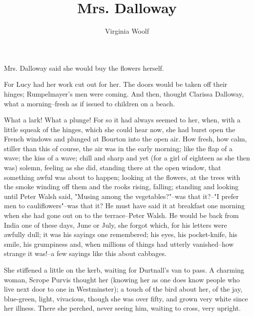 \documentclass[lang=cn,10pt]{elegantbook}
\title{Mrs. Dalloway}
\subtitle{Virginia Woolf}
\begin{document}
\maketitle
\frontmatter

\tableofcontents

\mainmatter

Mrs. Dalloway said she would buy the flowers herself.

For Lucy had her work cut out for her.  The doors would be taken
off their hinges; Rumpelmayer's men were coming.  And then, thought
Clarissa Dalloway, what a morning--fresh as if issued to children
on a beach.

What a lark!  What a plunge!  For so it had always seemed to her,
when, with a little squeak of the hinges, which she could hear now,
she had burst open the French windows and plunged at Bourton into
the open air.  How fresh, how calm, stiller than this of course,
the air was in the early morning; like the flap of a wave; the kiss
of a wave; chill and sharp and yet (for a girl of eighteen as she
then was) solemn, feeling as she did, standing there at the open
window, that something awful was about to happen; looking at the
flowers, at the trees with the smoke winding off them and the rooks
rising, falling; standing and looking until Peter Walsh said,
"Musing among the vegetables?"--was that it?--"I prefer men to
cauliflowers"--was that it?  He must have said it at breakfast one
morning when she had gone out on to the terrace--Peter Walsh.  He
would be back from India one of these days, June or July, she
forgot which, for his letters were awfully dull; it was his sayings
one remembered; his eyes, his pocket-knife, his smile, his
grumpiness and, when millions of things had utterly vanished--how
strange it was!--a few sayings like this about cabbages.

She stiffened a little on the kerb, waiting for Durtnall's van to
pass.  A charming woman, Scrope Purvis thought her (knowing her as
one does know people who live next door to one in Westminster); a
touch of the bird about her, of the jay, blue-green, light,
vivacious, though she was over fifty, and grown very white since
her illness.  There she perched, never seeing him, waiting to
cross, very upright.
\end{document}
